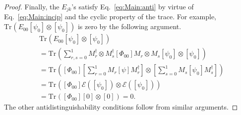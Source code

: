 \documentclass[DIV=calc,fontsize=12pt]{scrartcl} %
\theoremstyle{definition}
\theoremstyle{plain}
\newcommand{\Proj}[1]{\ensuremath{\left [ #1 \right ]}}
\newcommand{\Tr}[2][]{\ensuremath{\text{Tr}_{#1} \left ( #2 \right )}}
\begin{document}
\begin{proof}
Finally, the $E_{jk}$'s satisfy Eq.~\eqref{eq:Main:anti} by virtue
of Eq.~\eqref{eq:Main:incip} and the cyclic property of the trace.
For example, $\Tr{E_{00} \Proj{\psi_0} \otimes \Proj{\psi_0}}$ is zero by
the following argument.
\begin{align}
&\Tr{E_{00} \Proj{\psi_0} \otimes \Proj{\psi_0}} \nonumber\\
& = \Tr{\sum_{r,s
= 0}^1 M_r^{\dagger} \otimes M_s^{\dagger} \Proj{\Phi_{00}}
M_r \otimes
M_s \Proj{\psi_0} \otimes \Proj{\psi_0}} \\
& = \Tr{\Proj{\Phi_{00}} \left [ \sum_{r=0}^1 M_r \Proj{\psi}
M_r^{\dagger} \right ] \otimes \left [ \sum_{s=0}^1 M_s
\Proj{\psi_0} M_s^{\dagger} \right ]} \\
& = \Tr{\Proj{\Phi_{00}} \mathcal{E}(\Proj{\psi_0}) \otimes
\mathcal{E}(\Proj{\psi_0})} \\
& = \Tr{\Proj{\Phi_{00}} \Proj{0} \otimes \Proj{0}} = 0.
\end{align}
The other antidistinguishability conditions follow from similar
arguments.
\end{proof}
\end{document}

